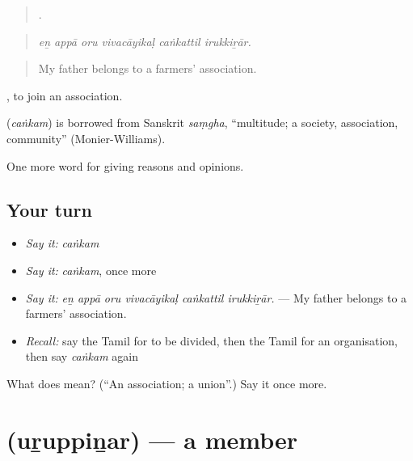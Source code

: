 \begin{quote}
     .
\end{quote}

\begin{quote}
\emph{eṉ appā oru vivacāyikaḷ caṅkattil irukkiṟār.}
\end{quote}

\begin{quote}
My father belongs to a farmers' association.
\end{quote}

 , to join an association.

\begin{cousinweb}
\textbf{} (\emph{caṅkam}) is borrowed from Sanskrit \emph{saṃgha}, \textquotedblleft{}multitude; a society, association, community\textquotedblright{} (Monier-Williams).
\end{cousinweb}

\begin{grammarlens}[title={What you've built}]
One more word for giving reasons and opinions.
\end{grammarlens}

\subsection*{Your turn}
\begin{itemize}
\raggedright
  \item \emph{Say it:} \emph{caṅkam}
  \item \emph{Say it:} \emph{caṅkam}, once more
  \item \emph{Say it:} \emph{eṉ appā oru vivacāyikaḷ caṅkattil irukkiṟār.} — My father belongs to a farmers' association.
  \item \emph{Recall:} say the Tamil for to be divided, then the Tamil for an organisation, then say \emph{caṅkam} again
\end{itemize}

\begin{tcolorbox}[breakable,colback=teal!4,colframe=teal!35!black,title={Before you move on}]
What does  mean? (\textquotedblleft{}An association; a union\textquotedblright{}.) Say it once more.
\end{tcolorbox}
\section[\texorpdfstring{\ta{உறுப்பினர்} (uṟuppiṉar)}{உறுப்பினர் (uṟuppiṉar)}]{ (uṟuppiṉar) — a member}

